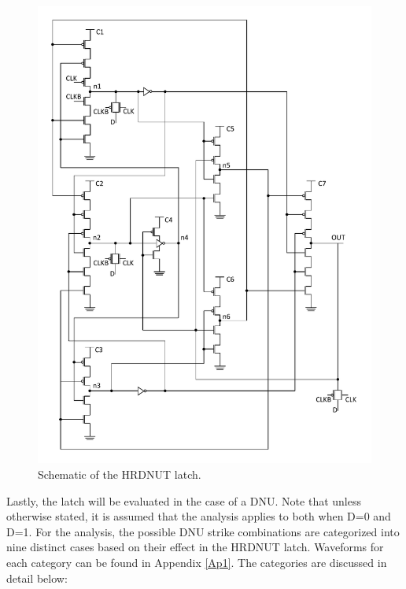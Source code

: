 \begin{figure}[!tbp]
	\centering
	\includegraphics[width=0.95\linewidth]{Figures/HRDNUT}
	\caption{Schematic of the HRDNUT latch.}
	\label{HRDNUT}
\end{figure} 

Lastly, the latch will be evaluated in the case of a DNU. Note that unless otherwise stated, it is assumed that the analysis applies to both when D=0 and D=1. For the analysis, the possible DNU strike combinations are categorized into nine distinct cases based on their effect in the HRDNUT latch. Waveforms for each category can be found in Appendix \ref{Ap1}. The categories are discussed in detail below:

